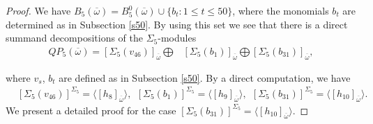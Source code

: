 \documentclass[reqno]{amsart}
\theoremstyle{plain}
\theoremstyle{definition}
\theoremstyle{plain}
\theoremstyle{definition}
\numberwithin{equation}{section}
\begin{document}
\begin{proof}
We have $B_5(\overline{\omega})= B_5^0(\overline{\omega})\cup\{b_t:1\leqslant t \leqslant 50\}$, where the monomials $b_t$ are determined as in Subsection \ref{s50}. By using this set we see that there is a direct summand decompositions of the $\Sigma_5$-modules
\begin{align*} 
QP_5(\overline{\omega}) = [\Sigma_5(v_{46})]_{\overline{\omega}}\bigoplus&[\Sigma_5(b_1)]_{\overline{\omega}}\bigoplus[\Sigma_5(b_{31})]_{\overline{\omega}},
\end{align*}

where $v_{s}$, $b_t$ are defined as in Subsection \ref{s50}. By a direct computation, we have  
\begin{align*}&[\Sigma_5(v_{46})]^{\Sigma_5} = \langle [h_8]_{\overline{\omega}}\rangle,\ \ [\Sigma_5(b_1)]^{\Sigma_5} = \langle [h_9]_{\overline{\omega}}\rangle, \ \ [\Sigma_5(b_{31})]^{\Sigma_5} = \langle [h_{10}]_{\overline{\omega}}\rangle.
\end{align*}
We present a detailed proof for the case $[\Sigma_5(b_{31})]^{\Sigma_5} = \langle [h_{10}]_{\overline{\omega}}\rangle$. 
	

\end{proof}
\end{document}
